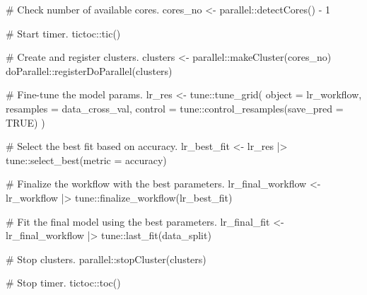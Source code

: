 \documentclass[
  letterpaper,
  DIV=11,
  numbers=noendperiod]{scrartcl}
\newenvironment{Shaded}{\begin{snugshade}}{\end{snugshade}}
\newcommand{\AttributeTok}[1]{\textcolor[rgb]{0.40,0.45,0.13}{#1}}
\newcommand{\CommentTok}[1]{\textcolor[rgb]{0.37,0.37,0.37}{#1}}
\newcommand{\ConstantTok}[1]{\textcolor[rgb]{0.56,0.35,0.01}{#1}}
\newcommand{\DecValTok}[1]{\textcolor[rgb]{0.68,0.00,0.00}{#1}}
\newcommand{\FunctionTok}[1]{\textcolor[rgb]{0.28,0.35,0.67}{#1}}
\newcommand{\NormalTok}[1]{\textcolor[rgb]{0.00,0.23,0.31}{#1}}
\newcommand{\OtherTok}[1]{\textcolor[rgb]{0.00,0.23,0.31}{#1}}
\newcommand{\SpecialCharTok}[1]{\textcolor[rgb]{0.37,0.37,0.37}{#1}}
\newcommand{\StringTok}[1]{\textcolor[rgb]{0.13,0.47,0.30}{#1}}
\begin{document}
\begin{Shaded}
\begin{Highlighting}[]
\CommentTok{\#\textquotesingle{} Check number of available cores.}
\NormalTok{cores\_no }\OtherTok{\textless{}{-}}\NormalTok{ parallel}\SpecialCharTok{::}\FunctionTok{detectCores}\NormalTok{() }\SpecialCharTok{{-}} \DecValTok{1}

\CommentTok{\#\textquotesingle{} Start timer.}
\NormalTok{tictoc}\SpecialCharTok{::}\FunctionTok{tic}\NormalTok{()}

\CommentTok{\# Create and register clusters.}
\NormalTok{clusters }\OtherTok{\textless{}{-}}\NormalTok{ parallel}\SpecialCharTok{::}\FunctionTok{makeCluster}\NormalTok{(cores\_no)}
\NormalTok{doParallel}\SpecialCharTok{::}\FunctionTok{registerDoParallel}\NormalTok{(clusters)}

\CommentTok{\# Fine{-}tune the model params.}
\NormalTok{lr\_res }\OtherTok{\textless{}{-}}\NormalTok{ tune}\SpecialCharTok{::}\FunctionTok{tune\_grid}\NormalTok{(}
  \AttributeTok{object =}\NormalTok{ lr\_workflow,}
  \AttributeTok{resamples =}\NormalTok{ data\_cross\_val,}
  \AttributeTok{control =}\NormalTok{ tune}\SpecialCharTok{::}\FunctionTok{control\_resamples}\NormalTok{(}\AttributeTok{save\_pred =} \ConstantTok{TRUE}\NormalTok{)}
\NormalTok{)}

\CommentTok{\# Select the best fit based on accuracy.}
\NormalTok{lr\_best\_fit }\OtherTok{\textless{}{-}} 
\NormalTok{  lr\_res }\SpecialCharTok{|\textgreater{}} 
\NormalTok{  tune}\SpecialCharTok{::}\FunctionTok{select\_best}\NormalTok{(}\AttributeTok{metric =} \StringTok{\textquotesingle{}accuracy\textquotesingle{}}\NormalTok{)}

\CommentTok{\# Finalize the workflow with the best parameters.}
\NormalTok{lr\_final\_workflow }\OtherTok{\textless{}{-}} 
\NormalTok{  lr\_workflow }\SpecialCharTok{|\textgreater{}}
\NormalTok{  tune}\SpecialCharTok{::}\FunctionTok{finalize\_workflow}\NormalTok{(lr\_best\_fit)}

\CommentTok{\# Fit the final model using the best parameters.}
\NormalTok{lr\_final\_fit }\OtherTok{\textless{}{-}} 
\NormalTok{  lr\_final\_workflow }\SpecialCharTok{|\textgreater{}} 
\NormalTok{  tune}\SpecialCharTok{::}\FunctionTok{last\_fit}\NormalTok{(data\_split)}

\CommentTok{\# Stop clusters.}
\NormalTok{parallel}\SpecialCharTok{::}\FunctionTok{stopCluster}\NormalTok{(clusters)}

\CommentTok{\# Stop timer.}
\NormalTok{tictoc}\SpecialCharTok{::}\FunctionTok{toc}\NormalTok{()}
\end{Highlighting}
\end{Shaded}
\end{document}
